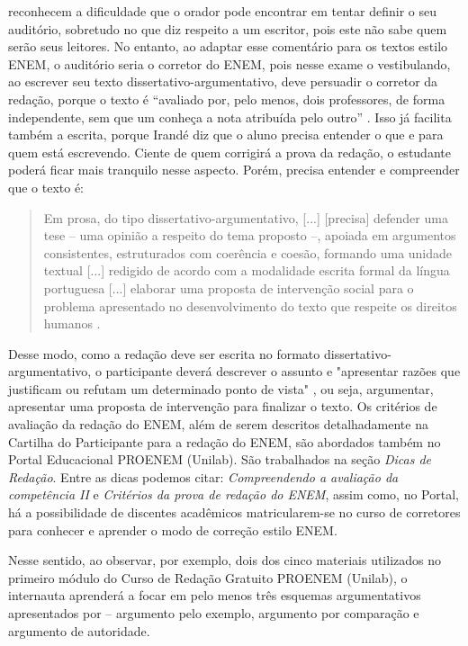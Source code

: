 \documentclass{textolivre}
\newcounter{quote}
\begin{document}
\textcite{perelman1996} reconhecem a dificuldade que o orador pode encontrar em tentar definir o seu auditório, sobretudo no que diz respeito a um escritor, pois este não sabe quem serão seus leitores. No entanto, ao adaptar esse comentário para os textos estilo ENEM, o auditório seria o corretor do ENEM, pois nesse exame o vestibulando, ao escrever seu texto dissertativo-argumentativo, deve persuadir o corretor da redação, porque o texto é “avaliado por, pelo menos, dois professores, de forma independente, sem que um conheça a nota atribuída pelo outro” \cite[p. 6]{inep2019}. Isso já facilita também a escrita, porque Irandé \textcite{antunes2003} diz que o aluno precisa entender o que e para quem está escrevendo. Ciente de quem corrigirá a prova da redação, o estudante poderá ficar mais tranquilo nesse aspecto. Porém, precisa entender e compreender que o texto é:

\begin{quote}
Em prosa, do tipo dissertativo-argumentativo, [...] [precisa] defender uma tese – uma opinião a respeito do tema proposto –, apoiada em argumentos consistentes, estruturados com coerência e coesão, formando uma unidade textual [...] redigido de acordo com a modalidade escrita formal da língua portuguesa [...] elaborar uma proposta de intervenção social para o problema apresentado no desenvolvimento do texto que respeite os direitos humanos \cite[p. 5, adaptada]{inep2019}.
\end{quote}

Desse modo, como a redação deve ser escrita no formato dissertativo-argumentativo, o participante deverá descrever o assunto e "apresentar razões que justificam ou refutam um determinado ponto de vista" \cite[p. 223]{fiorin2018}, ou seja, argumentar, apresentar uma proposta de intervenção para finalizar o texto. Os critérios de avaliação da redação do ENEM, além de serem descritos detalhadamente na Cartilha do Participante para a redação do ENEM, são abordados também no Portal Educacional PROENEM (Unilab). São trabalhados na seção \emph{Dicas de Redação}. Entre as dicas podemos citar: \emph{Compreendendo a avaliação da competência II} e \emph{Critérios da prova de redação do ENEM}, assim como, no Portal, há a possibilidade de discentes acadêmicos matricularem-se no curso de corretores para conhecer e aprender o modo de correção estilo ENEM.

Nesse sentido, ao observar, por exemplo, dois dos cinco materiais utilizados no primeiro módulo do Curso de Redação Gratuito PROENEM (Unilab), o internauta aprenderá a focar em pelo menos três esquemas argumentativos apresentados por \textcite{perelman1996} – argumento pelo exemplo, argumento por comparação e argumento de autoridade.
\end{document}

